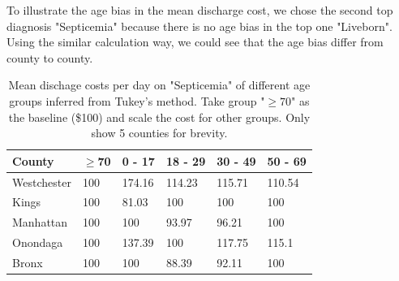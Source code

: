 \documentclass[10pt,twocolumn,letterpaper]{article}
\begin{document}
To illustrate the age bias in the mean discharge cost, we chose the second top diagnosis "Septicemia" because there is no age bias in the top one "Liveborn". Using the similar calculation way, we could see that the age bias differ from county to county. 
\begin{table}[t!]
\small
\begin{center}
\begin{tabular}{|l|l|l|l|l|l|}
\hline
\textbf{County} & \textbf{$\ge$70} & \textbf{0 - 17} & \textbf{18 - 29} & \textbf{30 - 49} & \textbf{50 - 69} \\ \hline
Westchester     & 100                  & 174.16           & 114.23            & 115.71            & 110.54            \\ \hline
Kings           & 100                  & 81.03            & 100               & 100               & 100               \\ \hline
Manhattan       & 100                  & 100              & 93.97             & 96.21             & 100               \\ \hline
Onondaga        & 100                  & 137.39           & 100               & 117.75            & 115.1             \\ \hline
Bronx           & 100                  & 100              & 88.39             & 92.11             & 100               \\ \hline
\end{tabular}
\end{center}
\caption{Mean dischage costs per day on "Septicemia" of different age groups inferred from Tukey's method. Take group "$\ge 70$" as the baseline (\$100) and scale the cost for other groups. Only show 5 counties for brevity.}
\end{table}
\end{document}
